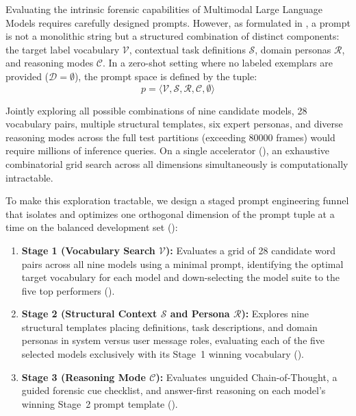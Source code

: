 Evaluating the intrinsic forensic capabilities of Multimodal Large Language Models requires carefully designed prompts. However, as formulated in , a prompt is not a monolithic string but a structured combination of distinct components: the target label vocabulary $\mathcal{V}$, contextual task definitions $\mathcal{S}$, domain personas $\mathcal{R}$, and reasoning modes $\mathcal{C}$. In a zero-shot setting where no labeled exemplars are provided ($\mathcal{D} = \emptyset$), the prompt space is defined by the tuple:
\begin{equation}
    p = \langle \mathcal{V}, \mathcal{S}, \mathcal{R}, \mathcal{C}, \emptyset \rangle
\end{equation}

Jointly exploring all possible combinations of nine candidate models, 28 vocabulary pairs, multiple structural templates, six expert personas, and diverse reasoning modes across the full test partitions (exceeding \num{80000} frames) would require millions of inference queries. On a single accelerator (), an exhaustive combinatorial grid search across all dimensions simultaneously is computationally intractable.

To make this exploration tractable, we design a staged prompt engineering funnel that isolates and optimizes one orthogonal dimension of the prompt tuple at a time on the balanced development set ():
\begin{enumerate}
    \item \textbf{Stage 1 (Vocabulary Search $\mathcal{V}$):} Evaluates a grid of 28 candidate word pairs across all nine models using a minimal prompt, identifying the optimal target vocabulary for each model and down-selecting the model suite to the five top performers ().
    \item \textbf{Stage 2 (Structural Context $\mathcal{S}$ and Persona $\mathcal{R}$):} Explores nine structural templates placing definitions, task descriptions, and domain personas in system versus user message roles, evaluating each of the five selected models exclusively with its Stage~1 winning vocabulary ().
    \item \textbf{Stage 3 (Reasoning Mode $\mathcal{C}$):} Evaluates unguided Chain-of-Thought, a guided forensic cue checklist, and answer-first reasoning on each model's winning Stage~2 prompt template ().
\end{enumerate}

